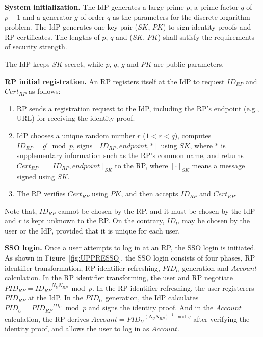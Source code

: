 \vspace{1mm}\noindent \textbf{System initialization.} The IdP %
 generates a large prime $p$, a prime factor $q$ of $p-1$
  and a generator $g$ of order $q$ as the parameters for the discrete logarithm problem. %
The IdP generates one key pair ($SK$, $PK$) to sign identity proofs and RP certificates.
The lengths of $p$, $q$ and ($SK$, $PK$) shall satisfy the requirements of security strength.

The IdP keeps $SK$ secret, while $p$, $q$, $g$ and $PK$ are public parameters.

\vspace{1mm}\noindent\textbf{RP initial registration.}
An RP registers itself at the IdP to request $ID_{RP}$ and $Cert_{RP}$ as follows:
\begin{enumerate}
\item RP sends a registration request to the IdP,
    including the RP's endpoint (e.g., URL) for receiving the identity proof.
\item IdP chooses a unique random number $r$ ($1 < r < q$), computes $ID_{RP} = g^r \bmod p$,
signs $[ID_{RP}, endpoint, *]$ using $SK$, where $*$ is  supplementary information such as the RP's common name,
and returns $Cert_{RP} = [ID_{RP}, endpoint]_{SK}$ to the RP, where $[\cdot]_{SK}$ means a message signed using $SK$.
\item The RP  verifies $Cert_{RP}$ using $PK$,  and then accepts $ID_{RP}$ and $Cert_{RP}$.
\end{enumerate}

Note that, $ID_{RP}$ cannot be chosen by the RP,
 and it must be chosen by the IdP and $r$ is kept unknown to the RP.
On the contrary,
    $ID_U$ may be chosen by the user or the IdP,
    provided that it is unique for each user.

\vspace{1mm}\noindent\textbf{SSO login.}
Once a user attempts to log in at an RP, the SSO login is initiated.
As shown in Figure~\ref{fig:UPPRESSO}, the SSO login consists of four phases,
 RP identifier transformation,
  RP identifier refreshing,
  $PID_U$ generation and $Account$ calculation.
In the RP identifier transforming, the user and RP negotiate $PID_{RP} = {ID_{RP}}^{N_{U} N_{RP}} \bmod p$.
In the RP identifier refreshing, the user registerers $PID_{RP}$ at the IdP.
In the $PID_U$ generation, the IdP calculates $PID_U = {PID_{RP}}^{ID_U} \bmod p$ and signs the identity proof.
And in the $Account$ calculation, the RP derives $Account = {{PID_{U}}}^{{(N_UN_{RP})^{-1} \bmod q}}$ after verifying the identity proof,
    and allows the user to log in as $Account$.

